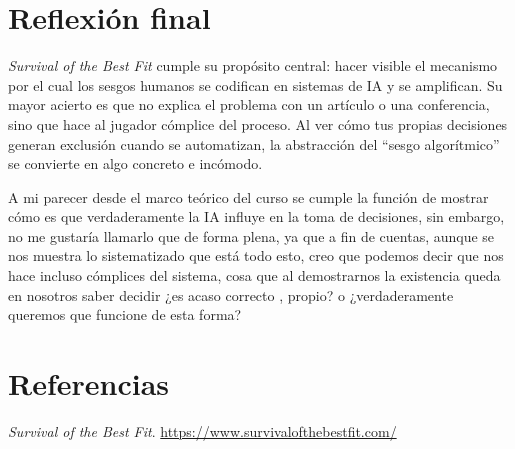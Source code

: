 \documentclass[12pt, a4paper]{article}
\begin{document}
\section{Reflexión final}

\textit{Survival of the Best Fit} cumple su propósito central: hacer visible el mecanismo por el cual los sesgos humanos se codifican en sistemas de IA y se amplifican. Su mayor acierto es que no explica el problema con un artículo o una conferencia, sino que hace al jugador cómplice del proceso. Al ver cómo tus propias decisiones generan exclusión cuando se automatizan, la abstracción del ``sesgo algorítmico'' se convierte en algo concreto e incómodo.

A mi parecer desde el marco teórico del curso se cumple la función de mostrar cómo es que verdaderamente la IA influye en la toma de decisiones, sin embargo, no me gustaría llamarlo que de forma plena, ya que a fin de cuentas, aunque se nos muestra lo sistematizado que está todo esto,
creo que podemos decir que nos hace incluso cómplices del sistema, cosa que al demostrarnos la existencia queda en nosotros saber decidir ¿es acaso correcto , propio? o ¿verdaderamente queremos que funcione de esta forma?


\section*{Referencias}

\begin{enumerate}[leftmargin=2em, label={[\arabic*]}]
    \item \textit{Survival of the Best Fit}. \url{https://www.survivalofthebestfit.com/}
\end{enumerate}
\end{document}
